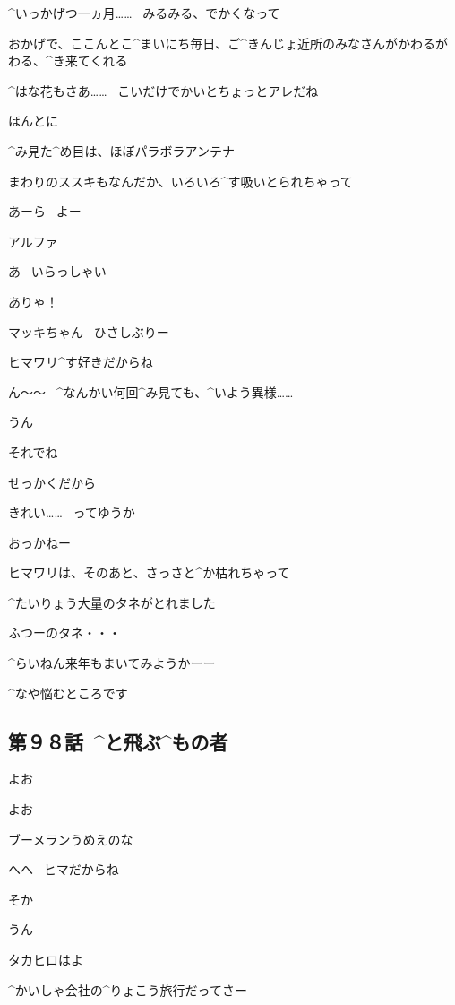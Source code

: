 \Alpha ^{いっかげつ}{一ヵ月}……
\ みるみる、でかくなって

\page
\Alpha おかげで、ここんとこ^{まいにち}{毎日}、ご^{きんじょ}{近所}のみなさんがかわるがわる、^{き}{来}てくれる

\Person ^{はな}{花}もさあ……
\ こいだけでかいとちょっとアレだね

\Alpha ほんとに

\page
\Alpha ^{み}{見}た^{め}{目}は、ほぼパラボラアンテナ

\Alpha まわりのススキもなんだか、いろいろ^{す}{吸}いとられちゃって

\Person あーら
\ よー

\page
\Takahiro アルファ

\Alpha あ
\ いらっしゃい

\Alpha ありゃ！

\Alpha マッキちゃん
\ ひさしぶりー

\Makki ヒマワリ^{す}{好}きだからね

\page
\Takahiro ん〜〜
\ ^{なんかい}{何回}^{み}{見}ても、^{いよう}{異様}……

\Alpha うん

\Takahiro それでね

\Takahiro せっかくだから

\page[135]
\Alpha きれい……
\ ってゆうか

 おっかねー

\page
\Alpha ヒマワリは、そのあと、さっさと^{か}{枯}れちゃって

\Alpha ^{たいりょう}{大量}のタネがとれました

\Alpha ふつーのタネ・・・

\Alpha ^{らいねん}{来年}もまいてみようかーー

\Alpha ^{なや}{悩}むところです


\subsection{第９８話\ ^{と}{飛}ぶ^{もの}{者}}

\page[140]
\Ayase よお

\Makki よお

\page
\Ayase ブーメランうめえのな

\Makki へへ
\ ヒマだからね

\Ayase そか

\Makki うん

\Ayase タカヒロはよ

\Makki ^{かいしゃ}{会社}の^{りょこう}{旅行}だってさー

